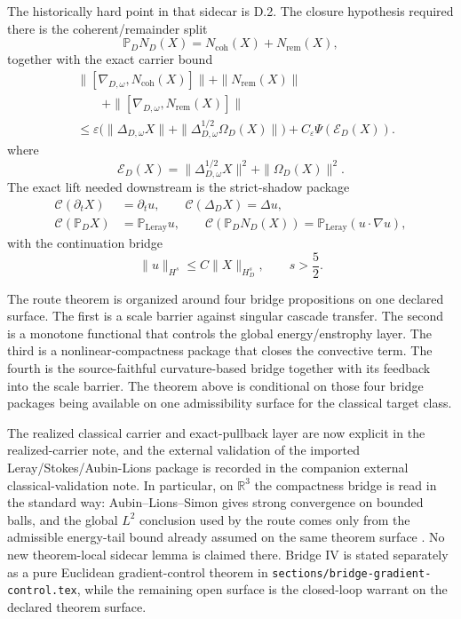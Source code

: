 The historically hard point in that sidecar is D.2. The closure hypothesis required there is
the coherent/remainder split
\[
\mathbb P_DN_D(X)=N_{\mathrm{coh}}(X)+N_{\mathrm{rem}}(X),
\]
together with the exact carrier bound
\[
\begin{aligned}
&\|[\nabla_{D,\omega},N_{\mathrm{coh}}(X)]\|
+\|N_{\mathrm{rem}}(X)\|\\
&\qquad
+\|[\nabla_{D,\omega},N_{\mathrm{rem}}(X)]\|\\
&\le
\varepsilon\Big(
\|\Delta_{D,\omega}X\|
+\|\Delta_{D,\omega}^{1/2}\Omega_D(X)\|
\Big)
+C_\varepsilon\Psi(\mathcal E_D(X)).
\end{aligned}
\]
where
\[
\mathcal E_D(X)=\|\Delta_{D,\omega}^{1/2}X\|^2+\|\Omega_D(X)\|^2.
\]
The exact lift needed downstream is the strict-shadow package
\[
\begin{aligned}
\mathcal C(\partial_t X)&=\partial_t u,\qquad
\mathcal C(\Delta_DX)=\Delta u,\\
\mathcal C(\mathbb P_DX)&=\mathbb P_{\mathrm{Leray}}u,\qquad
\mathcal C(\mathbb P_DN_D(X))=\mathbb P_{\mathrm{Leray}}(u\cdot\nabla u),
\end{aligned}
\]
with the continuation bridge
\[
\|u\|_{H^s}\le C\|X\|_{H_D^s},\qquad s>\frac52.
\]

The route theorem is organized around four bridge propositions on one declared
surface. The first is a scale barrier against singular cascade transfer. The
second is a monotone functional that controls the global energy/enstrophy
layer. The third is a nonlinear-compactness package that closes the convective
term. The fourth is the source-faithful curvature-based bridge together with
its feedback into the scale barrier. The theorem above is conditional on those
four bridge packages being available on one admissibility surface for the
classical target class.

The realized classical carrier and exact-pullback layer are now explicit in the
realized-carrier note, and the external validation of the imported
Leray/Stokes/Aubin-Lions package is recorded in the companion external
classical-validation note. In
particular, on \(\mathbb R^3\) the compactness bridge is read in the standard
way: Aubin--Lions--Simon gives strong convergence on bounded balls, and the
global \(L^2\) conclusion used by the route comes only from the admissible
energy-tail bound already assumed on the same theorem surface
\cite{Temam2001,Simon1987,BoyerFabrie2013}. No new theorem-local sidecar lemma
is claimed there. Bridge IV is stated separately as a pure Euclidean
gradient-control theorem in \texttt{sections/bridge-gradient-control.tex},
while the remaining open surface is the closed-loop warrant on the declared
theorem surface.
